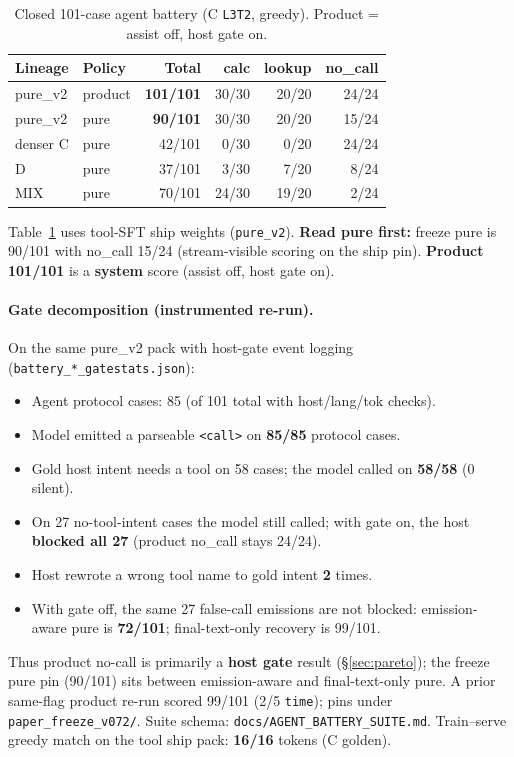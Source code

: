 \documentclass[11pt,a4paper]{article}
\begin{document}
\begin{table}[ht]
\centering
\caption{Closed 101-case agent battery (C \texttt{L3T2}, greedy). Product = assist off, host gate on.}
\label{tab:agent}
\setlength{\tabcolsep}{3.5pt}
\begin{tabular}{@{}llrrrr@{}}
\toprule
Lineage & Policy & Total & calc & lookup & no\_call \\
\midrule
pure\_v2 & product & \textbf{101/101} & 30/30 & 20/20 & 24/24 \\
pure\_v2 & pure & \textbf{90/101} & 30/30 & 20/20 & 15/24 \\
denser C & pure & 42/101 & 0/30 & 0/20 & 24/24 \\
D & pure & 37/101 & 3/30 & 7/20 & 8/24 \\
MIX & pure & 70/101 & 24/30 & 19/20 & 2/24 \\
\bottomrule
\end{tabular}
\end{table}

Table~\ref{tab:agent} uses tool-SFT ship weights (\texttt{pure\_v2}).
\textbf{Read pure first:} freeze pure is 90/101 with no\_call 15/24 (stream-visible scoring on the ship pin).
\textbf{Product 101/101} is a \textbf{system} score (assist off, host gate on).

\paragraph{Gate decomposition (instrumented re-run).}
On the same pure\_v2 pack with host-gate event logging (\texttt{battery\_*\_gatestats.json}):
\begin{itemize}[leftmargin=*,itemsep=1pt]
  \item Agent protocol cases: 85 (of 101 total with host/lang/tok checks).
  \item Model emitted a parseable \texttt{<call>} on \textbf{85/85} protocol cases.
  \item Gold host intent needs a tool on 58 cases; the model called on \textbf{58/58} (0 silent).
  \item On 27 no-tool-intent cases the model still called; with gate on, the host \textbf{blocked all 27} (product no\_call stays 24/24).
  \item Host rewrote a wrong tool name to gold intent \textbf{2} times.
  \item With gate off, the same 27 false-call emissions are not blocked: emission-aware pure is \textbf{72/101}; final-text-only recovery is 99/101.
\end{itemize}
Thus product no-call is primarily a \textbf{host gate} result (\S\ref{sec:pareto}); the freeze pure pin (90/101) sits between emission-aware and final-text-only pure.
A prior same-flag product re-run scored 99/101 (2/5 \texttt{time}); pins under \texttt{paper\_freeze\_v072/}.
Suite schema: \texttt{docs/AGENT\_BATTERY\_SUITE.md}.
Train--serve greedy match on the tool ship pack: \textbf{16/16} tokens (C golden).
\end{document}
